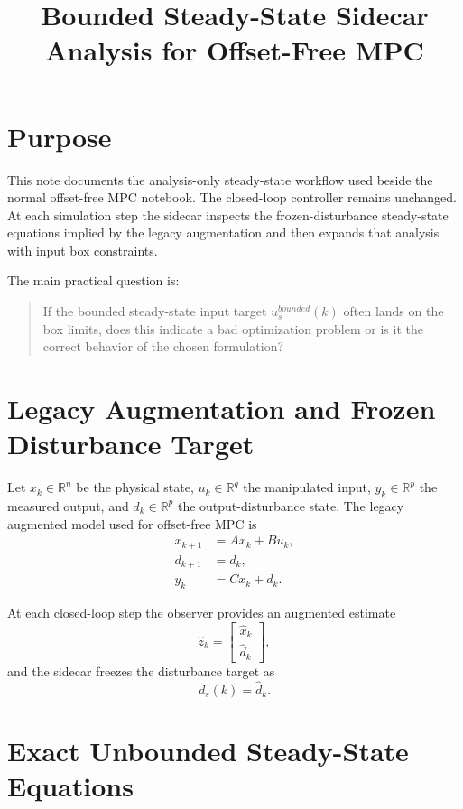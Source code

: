 \documentclass[11pt]{article}
\title{Bounded Steady-State Sidecar Analysis for Offset-Free MPC}
\date{}
\begin{document}
\maketitle

\section{Purpose}

This note documents the analysis-only steady-state workflow used beside the normal offset-free MPC notebook. The closed-loop controller remains unchanged. At each simulation step the sidecar inspects the frozen-disturbance steady-state equations implied by the legacy augmentation and then expands that analysis with input box constraints.

The main practical question is:
\begin{quote}
If the bounded steady-state input target $u_s^{bounded}(k)$ often lands on the box limits, does this indicate a bad optimization problem or is it the correct behavior of the chosen formulation?
\end{quote}

\section{Legacy Augmentation and Frozen Disturbance Target}

Let $x_k \in \mathbb{R}^n$ be the physical state, $u_k \in \mathbb{R}^q$ the manipulated input, $y_k \in \mathbb{R}^p$ the measured output, and $d_k \in \mathbb{R}^p$ the output-disturbance state. The legacy augmented model used for offset-free MPC is
\begin{align}
x_{k+1} &= A x_k + B u_k, \\
d_{k+1} &= d_k, \\
y_k &= C x_k + d_k.
\end{align}

At each closed-loop step the observer provides an augmented estimate
\[
\hat z_k = \begin{bmatrix}\hat x_k \\ \hat d_k\end{bmatrix},
\]
and the sidecar freezes the disturbance target as
\[
d_s(k) = \hat d_k.
\]

\section{Exact Unbounded Steady-State Equations}
\end{document}
